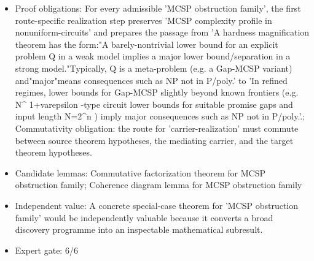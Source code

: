 \documentclass[11pt]{article}
\begin{document}
\begin{itemize}
\item Proof obligations: For every admissible 'MCSP obstruction family', the first route-specific realization step preserves 'MCSP complexity profile in nonuniform-circuits' and prepares the passage from 'A hardness magnification theorem has the form:"A barely-nontrivial lower bound for an explicit problem Q in a weak model implies a major lower bound/separation in a strong model."Typically, Q is a meta-problem (e.g. a Gap-MCSP variant) and"major"means consequences such as NP not in P/poly.' to 'In refined regimes, lower bounds for Gap-MCSP slightly beyond known frontiers (e.g. N\textasciicircum{} 1+varepsilon -type circuit lower bounds for suitable promise gaps and input length N=2\textasciicircum{}n ) imply major consequences such as NP not in P/poly.'.; Commutativity obligation: the route for 'carrier-realization' must commute between source theorem hypotheses, the mediating carrier, and the target theorem hypotheses.
\item Candidate lemmas: Commutative factorization theorem for MCSP obstruction family; Coherence diagram lemma for MCSP obstruction family
\item Independent value: A concrete special-case theorem for 'MCSP obstruction family' would be independently valuable because it converts a broad discovery programme into an inspectable mathematical subresult.
\item Expert gate: 6/6
\end{itemize}
\end{document}
